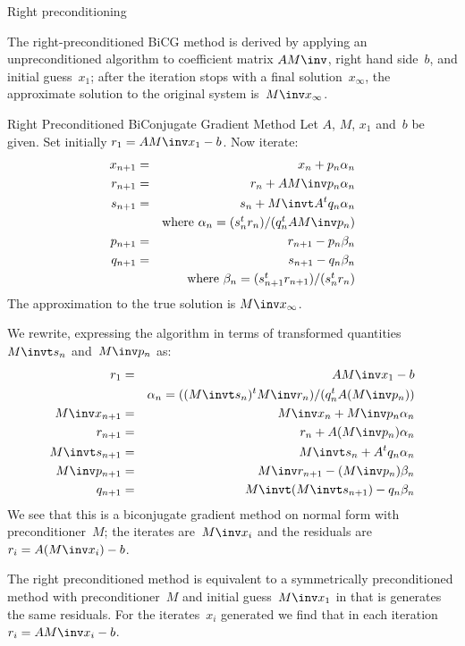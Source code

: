 \documentclass[11pt]{artikel3}
\begin{document}
\begin{Outline}
 {Right preconditioning}

The right-preconditioned BiCG method is derived by applying an
unpreconditioned algorithm to coefficient matrix $AM\inv$, right
hand side~$b$, and initial guess~$x_1$; after the iteration stops
with a final solution~$x_\infty$,
the approximate solution to the original system is~$M\inv x_\infty$.
\begin{algorithm}{Right Preconditioned BiConjugate Gradient Method}
Let $A$, $M$, $x_1$ and~$b$ be given. Set initially
$r_1=AM\inv x_1-b$. Now iterate:
\begin{eqnarray*}
    x_{n+1}&=&x_n+p_n\alpha_n\\
    r_{n+1}&=&r_n+AM\inv p_n\alpha_n\\
    s_{n+1}&=&s_n+M\invt A^tq_n\alpha_n\\
    &&\hbox{where $\alpha_n=(s_n^tr_n)/(q_n^tAM\inv p_n)$}\\
    p_{n+1}&=&r_{n+1}-p_n\beta_n\\
    q_{n+1}&=&s_{n+1}-q_n\beta_n\\
    &&\hbox{where $\beta_n=(s_{n+1}^tr_{n+1})/(s_n^tr_n)$}
\end{eqnarray*}
The approximation to the true solution is $M\inv x_\infty$.
\end{algorithm}

We rewrite, expressing the algorithm in terms of 
transformed quantities $M\invt s_n$ and~$M\inv p_n$ as:
\begin{eqnarray*}
    r_1&=&AM\inv x_1-b\\
    &&\alpha_n=((M\invt s_n)^tM\inv r_n)/(q_n^tA(M\inv p_n))\\
    M\inv x_{n+1}&=&M\inv x_n+M\inv p_n\alpha_n\\
    r_{n+1}&=&r_n+A(M\inv p_n)\alpha_n\\
    M\invt s_{n+1}&=&M\invt s_n+A^tq_n\alpha_n\\
    M\inv p_{n+1}&=&M\inv r_{n+1}-(M\inv p_n)\beta_n\\
    q_{n+1}&=&M\invt (M\invt s_{n+1})-q_n\beta_n\\
\end{eqnarray*}
We see that this is a biconjugate gradient method on normal
form with preconditioner~$M$; 
the iterates are~$M\inv x_i$ and the residuals
are $r_i=A(M\inv x_i)-b$.

\begin{lemma}
The right preconditioned method is equivalent to a symmetrically
preconditioned method with preconditioner~$M$ 
and initial guess~$M\inv x_1$ in that is generates the same
residuals. For the iterates~$x_i$ generated we find that in
each iteration $r_i=AM\inv x_i-b$.
\end{lemma}


\end{Outline}
\end{document}
